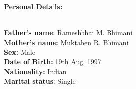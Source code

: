 \documentclass[12pt,a4paper,english]{article}
\begin{document}
	\begin{flushleft}	
		\begin{LARGE}
			\textbf{Personal Details:}
		\end{LARGE}\\
		\vspace{0.12in}
		\hspace{1.75in}\textbf{Father's name:} Rameshbhai M. Bhimani\\
		\hspace{1.75in}\textbf{Mother's name:} Muktaben R. Bhimani\\
		\hspace{1.75in}\textbf{Sex:} Male\\
		\hspace{1.75in}\textbf{Date of Birth:} 19th Aug, 1997\\	
		\hspace{1.75in}\textbf{Nationality:} Indian\\
		\hspace{1.75in}\textbf{Marital status:} Single\\
		\vspace{0.3in}
	\hline
	\end{flushleft}
\end{document}
